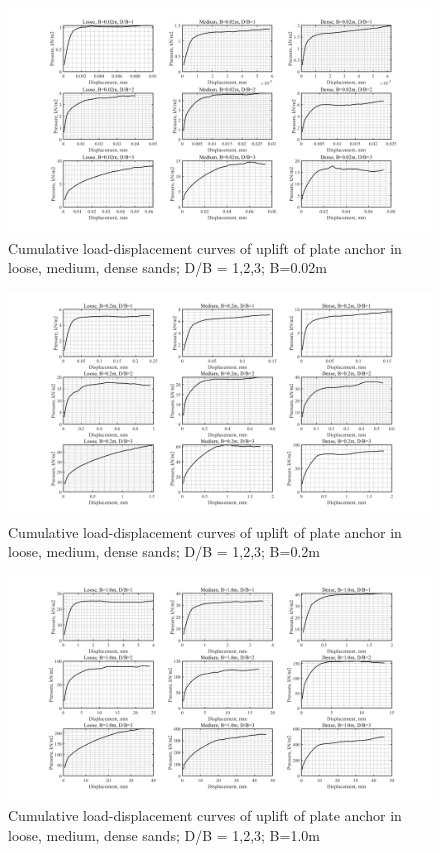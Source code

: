\documentclass[a4paper, nobind]{templates/ociamthesis}
\begin{document}
\begin{figure}[H]
\includegraphics[width=1\linewidth]{myfigureeeeee/CodeA} \caption{Cumulative load-displacement curves of uplift of plate anchor in loose, medium, dense sands; D/B = 1,2,3; B=0.02m }\label{fig:unnamed-chunk-34}
\end{figure}

\begin{figure}[H]
\includegraphics[width=1\linewidth]{myfigureeeeee/CodeB} \caption{Cumulative load-displacement curves of uplift of plate anchor in loose, medium, dense sands; D/B = 1,2,3; B=0.2m}\label{fig:unnamed-chunk-35}
\end{figure}

\begin{figure}[H]
\includegraphics[width=1\linewidth]{myfigureeeeee/CodeC} \caption{Cumulative load-displacement curves of uplift of plate anchor in loose, medium, dense sands; D/B = 1,2,3; B=1.0m}\label{fig:unnamed-chunk-36}
\end{figure}
\end{document}
